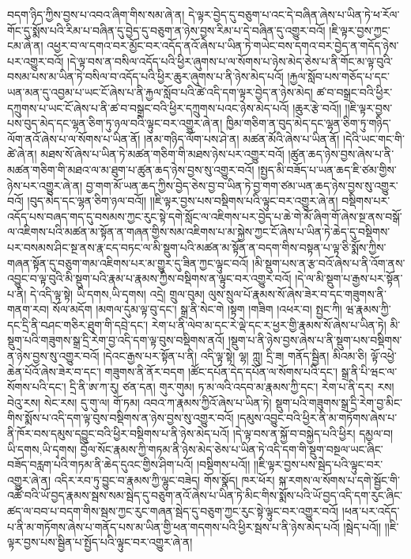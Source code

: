 བདག་ཉིད་ཀྱིས་བྱས་པ་འབའ་ཞིག་གིས་སམ་ཞེ་ན། དེ་ལྟར་བྱེད་དུ་བཅུག་པ་འང་དེ་བཞིན་ཞེས་པ་ཡིན་ཏེ་ཕ་རོལ་གོང་དུ་སྨོས་པའི་རིམ་པ་བཞིན་དུ་བྱེད་དུ་བཅུག་ན་ཉེས་བྱས་རིམ་པ་དེ་བཞིན་དུ་འགྱུར་བའོ། །ཇི་ལྟར་བྱས་ཀྱང་ངམ་ཞེ་ན། འཕྱར་བ་ལ་དགའ་བར་མྱོང་བར་འདོད་ནའོ་ཞེས་པ་ཡིན་ཏེ་གཡེང་བས་དགའ་བར་བྱེད་ན་གདོད་ཉེས་པར་འགྱུར་བའོ། །དེ་ལྟ་བས་ན་བསིལ་འདོད་པའི་ཕྱིར་ཞུགས་པ་ལ་སོགས་པ་ཉེས་མེད་ཅེས་པ་ནི་གོང་མ་ལྟ་བུའི་བསམ་པས་མ་ཡིན་ཏེ་བསིལ་བ་འདོད་པའི་ཕྱིར་ཆུར་ཞུགས་པ་ནི་ཉེས་མེད་པའོ། །རྐྱལ་སློབ་པས་གཅོད་པ་དང་ཡན་མན་དུ་འབྱམ་པ་ཡང་ངོ་ཞེས་པ་ནི་རྐྱལ་སློབ་པའི་ཚེ་འདི་དག་ལྟར་བྱེད་ན་ཉེས་མེད། ཚ་བ་བསྒྲང་བའི་ཕྱིར་དཀྲུགས་པ་ཡང་ངོ་ཞེས་པ་ནི་ཚ་བ་བསྒྲང་བའི་ཕྱིར་དཀྲུགས་པའང་ཉེས་མེད་པའོ། །ཆུར་རྩེ་བའོ།། །།ཇི་ལྟར་བྱས་པས་བུད་མེད་དང་ལྷན་ཅིག་ཏུ་ཉལ་བའི་ལྟུང་བར་འགྱུར་ཞེ་ན། ཁྱིམ་གཅིག་ན་བུད་མེད་དང་ལྷན་ཅིག་ཏུ་གཉིད་ལོག་ནའོ་ཞེས་པ་ལ་སོགས་པ་ཡིན་ནོ། །ནམ་གཉིད་ལོག་པས་ཤེ་ན། མཚན་མོའི་ཞེས་པ་ཡིན་ནོ། །དེའི་ཡང་གང་གི་ཚེ་ཞེ་ན། མཐས་སོ་ཞེས་པ་ཡིན་ཏེ་མཚན་གཅིག་གི་མཐས་ཉེས་པར་འགྱུར་བའོ། །ཚུན་ཆད་ཉེས་བྱས་ཞེས་པ་ནི་མཚན་གཅིག་གི་མཐའ་ལ་མ་ཐུག་པ་ཚུན་ཆད་ཉེས་བྱས་སུ་འགྱུར་བའོ། །སྤྱད་མི་བཟོད་པ་ཡན་ཆད་ཇི་ཙམ་གྱིས་ཉེས་པར་འགྱུར་ཞེ་ན། བྱ་གག་མོ་ཡན་ཆད་ཀྱིས་བྱེད་ཅེས་བྱ་བ་ཡིན་ཏེ་བྱ་གག་ཙམ་ཡན་ཆད་ཉེས་བྱས་སུ་འགྱུར་བའོ། །བུད་མེད་དང་ལྷན་ཅིག་ཉལ་བའོ།། །།ཇི་ལྟར་བྱས་པས་བསྡིགས་པའི་ལྟུང་བར་འགྱུར་ཞེ་ན། བསྡིགས་པར་འདོད་པས་བཞད་གད་དུ་བསམས་ཀྱང་རུང་སྟེ་དགེ་སློང་ལ་འཇིགས་པར་བྱེད་པ་ཆེ་གེ་མོ་ཞིག་གོ་ཞེས་སྔ་ནས་བསྒོ་ལ་འཇིགས་པའི་མཚན་མ་སྟོན་ན་གཞན་གྱིས་སམ་འཇིགས་པ་མ་སྐྱེས་ཀྱང་ངོ་ཞེས་པ་ཡིན་ཏེ་ཆེད་དུ་བསྡིགས་པར་བསམས་ཤིང་སྔ་ནས་རྣ་ངད་བཏང་ལ་མི་སྡུག་པའི་མཚན་མ་སྟོན་ན་བདག་གིས་བསྟན་པ་ལྟ་ཅི་སྨོས་ཀྱིས་གཞན་སྟོན་དུ་བཅུག་གམ་འཇིགས་པར་མ་གྱུར་དུ་ཟིན་ཀྱང་ལྟུང་བའོ། །མི་སྡུག་པས་ན་རྩ་བའོ་ཞེས་པ་ནི་འོག་ནས་འབྱུང་བ་ལྟ་བུའི་མི་སྡུག་པའི་རྣམ་པ་རྣམས་ཀྱིས་བསྡིགས་ན་ལྟུང་བར་འགྱུར་བའོ། །དེ་ལ་མི་སྡུག་པ་རྒྱས་པར་སྟོན་པ་ནི། དེ་འདི་ལྟ་སྟེ། {ཡི་དགས,ཡི་དྭགས}། འདྲེ། གྲུལ་བུམ། ལུས་སྲུལ་པོ་རྣམས་སོ་ཞེས་ཟེར་བ་དང་གཟུགས་ནི་གནག་རབ། སོལ་མདོག །མགལ་དུམ་ལྟ་བུ་དང་། སྒྲ་ནི་སེང་གེ །སྟག །གཟིག །འཕར་བ། སྤྱང་ཀི། ཝ་རྣམས་ཀྱི་དང་དྲི་ནི་བཤང་གཅིར་ཐུག་གི་དབྲེ་དང་། རེག་པ་ནི་ལེབ་མ་དང་རེ་ལྡེ་དང་ར་ཕྱར་གྱི་རྣམས་སོ་ཞེས་པ་ཡིན་ཏེ། མི་སྡུག་པའི་གཟུགས་སྒྲ་དྲི་རེག་བྱ་འདི་དག་ལྟ་བུས་བསྡིགས་ནའོ། །སྡུག་པ་ནི་ཉེས་བྱས་ཞེས་པ་ནི་སྡུག་པས་བསྡིགས་ན་ཉེས་བྱས་སུ་འགྱུར་བའོ། །དེའང་རྒྱས་པར་སྟོན་པ་ནི། འདི་ལྟ་སྟེ། ལྷ། ཀླུ། དྲི་ཟ། གནོད་སྦྱིན། མིའམ་ཅི། ལྟོ་འཕྱེ་ཆེན་པོའོ་ཞེས་ཟེར་བ་དང་། གཟུགས་ནི་ནོར་བདག །ཚོང་དཔོན་དེད་དཔོན་ལ་སོགས་པའི་དང་། སྒྲ་ནི་པི་ཝང་ལ་སོགས་པའི་དང་། དྲི་ནི་ཨ་ཀ་རུ། ཙན་དན། གུར་གུམ། ཏ་མ་ལའི་འདབ་མ་རྣམས་ཀྱི་དང་། རེག་པ་ནི་དར། རས། བེའུ་རས། སེང་རས། དུ་གུ་ལ། གོ་ཏམ། འབའ་ཀ་རྣམས་ཀྱིའོ་ཞེས་པ་ཡིན་ཏེ། སྡུག་པའི་གཟུགས་སྒྲ་དྲི་རེག་བྱ་མིང་གིས་སྨོས་པ་འདི་དག་ལྟ་བུས་བསྡིགས་ན་ཉེས་བྱས་སུ་འགྱུར་བའོ། །དམུས་འབྱུང་བའི་ཕྱིར་ནི་མ་གཏོགས་ཞེས་པ་ནི་ཁོར་བས་དམུས་དབྱུང་བའི་ཕྱིར་བསྡིགས་པ་ནི་ཉེས་མེད་པའོ། །དེ་ལྟ་བས་ན་སྐྱོ་བ་བསྐྱེད་པའི་ཕྱིར། དམྱལ་བ། {ཡི་དགས,ཡི་དྭགས}། བྱོལ་སོང་རྣམས་ཀྱི་གཏམ་ནི་ཉེས་མེད་ཅེས་པ་ཡིན་ཏེ་འདི་དག་གི་སྡུག་བསྔལ་ཡང་ཞིང་བཟོད་བརླག་པའི་གཏམ་ནི་ཆེད་དུའང་གྱིས་ཤིག་པའོ། །བསྡིགས་པའོ།། །།ཇི་ལྟར་བྱས་པས་སྦེད་པའི་ལྟུང་བར་འགྱུར་ཞེ་ན། འདིར་རབ་ཏུ་བྱུང་བ་རྣམས་ཀྱི་ལྷུང་བཟེད། གོས་སྣོད། ཁར་ཕོར། སྐ་རགས་ལ་སོགས་པ་དགེ་སྦྱོང་གི་འཚོ་བའི་ཡོ་བྱད་རྣམས་སྦས་སམ་སྦེད་དུ་བཅུག་ནའོ་ཞེས་པ་ཡིན་ཏེ་མིང་གིས་སྨོས་པའི་ཡོ་བྱད་འདི་དག་རུང་ཞིང་ཚད་ལ་བབ་པ་བདག་གིས་སྦས་ཀྱང་རུང་གཞན་སྦེད་དུ་བཅུག་ཀྱང་རུང་སྟེ་ལྟུང་བར་འགྱུར་བའོ། །ཕན་པར་འདོད་པ་ནི་མ་གཏོགས་ཞེས་པ་གནོད་པས་མ་ཡིན་གྱི་ཕན་གདགས་པའི་ཕྱིར་སྦས་པ་ནི་ཉེས་མེད་པའོ། །སྦེད་པའོ།། །།ཇི་ལྟར་བྱས་པས་སྦྱིན་པ་སྤྱོད་པའི་ལྟུང་བར་འགྱུར་ཞེ་ན། 